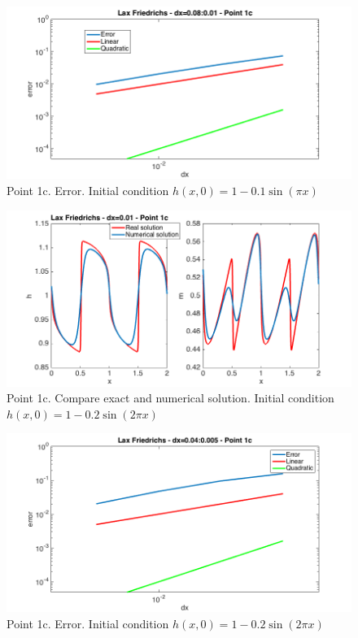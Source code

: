 \documentclass[oneside,12pt]{book}  %
\theoremstyle{plain}
\theoremstyle{definition}
\theoremstyle{remark}
\numberwithin{equation}{chapter} %
\begin{document}
\begin{figure}[h]
\label{img:lf_1c_1_error}
\centering
\includegraphics[scale=0.5]{Immagini/LF/1c-1-error.png}
\caption{Point 1c. Error. Initial condition $h(x,0)=1-0.1\sin(\pi x)$}
\end{figure}

\begin{figure}[h]
\label{img:lf_1c_2_solution}
\centering
\includegraphics[scale=0.5]{Immagini/LF/1c-2-solution.png}
\caption{Point 1c. Compare exact and numerical solution. Initial condition $h(x,0)=1-0.2\sin(2\pi x)$}
\end{figure}

\begin{figure}[h]
\label{img:lf_1c_2_error}
\centering
\includegraphics[scale=0.5]{Immagini/LF/1c-2-error.png}
\caption{Point 1c. Error. Initial condition $h(x,0)=1-0.2\sin(2\pi x)$}
\end{figure}
\end{document}
